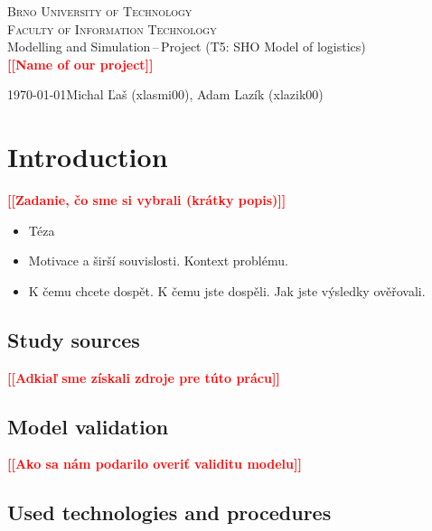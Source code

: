 \documentclass[a4paper, 11pt, a4paper]{article}
\newcommand{\todo}[1]{\textcolor{red}{\textbf{[[#1]]}}}
\begin{document}
\begin{titlepage}
    \begin{center}
            \textsc{\Huge Brno University of Technology \\}
            \vspace{0.5em}
            \textsc{\huge Faculty of Information Technology \\}
            {\LARGE 	Modelling and Simulation\,--\,Project (T5: SHO Model of logistics) \\
            \vspace{0.4em}
            \Huge \todo{Name of our project}}
    \end{center}
    {\Large \today \hfill Michal Ľaš (xlasmi00), Adam Lazík (xlazik00)}
\end{titlepage}

\tableofcontents
\newpage

\section{Introduction}

\noindent\todo{Zadanie, čo sme si vybrali (krátky popis)\cite{placeholder.cite}}

\begin{itemize}
    \item Téza
    \item Motivace a širší souvislosti. Kontext problému.
    \item K čemu chcete dospět. K čemu jste dospěli. Jak jste výsledky
    ověřovali.
\end{itemize}

\subsection{Study sources}

\noindent\todo{Adkiaľ sme získali zdroje pre túto prácu}


\subsection{Model validation}

\noindent\todo{Ako sa nám podarilo overiť validitu modelu}


\subsection{Used technologies and procedures}
\end{document}
